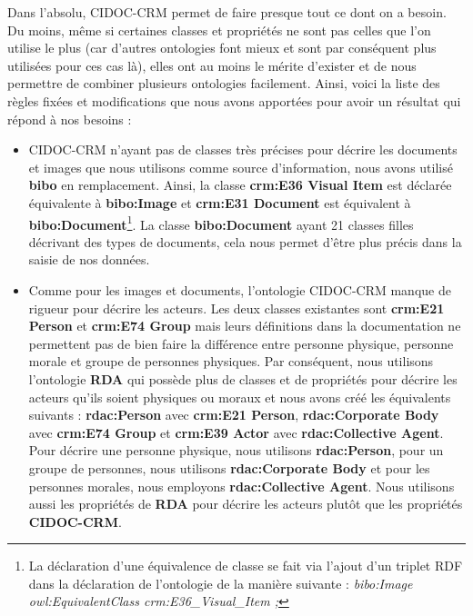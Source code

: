 Dans l'absolu, CIDOC-CRM permet de faire presque tout ce dont on a besoin. Du moins, même si certaines classes et propriétés ne sont pas celles que l'on utilise le plus (car d'autres ontologies font mieux et sont par conséquent plus utilisées pour ces cas là), elles ont au moins le mérite d'exister et de nous permettre de combiner plusieurs ontologies facilement. Ainsi, voici la liste des règles fixées et modifications que nous avons apportées pour avoir un résultat qui répond à nos besoins :
\begin{itemize}
    \item[\ding{103}] CIDOC-CRM n'ayant pas de classes très précises pour décrire les documents et images que nous utilisons comme source d'information, nous avons utilisé \textbf{bibo} en remplacement. Ainsi, la classe \textbf{crm:E36 Visual Item} est déclarée équivalente à \textbf{bibo:Image} et \textbf{crm:E31 Document} est équivalent à \textbf{bibo:Document}\footnote{La déclaration d'une équivalence de classe se fait via l'ajout d'un triplet RDF dans la déclaration de l'ontologie de la manière suivante : \textit{bibo:Image owl:EquivalentClass crm:E36\_Visual\_Item ;}}. La classe \textbf{bibo:Document} ayant 21 classes filles décrivant des types de documents, cela nous permet d'être plus précis dans la saisie de nos données.
    \item[\ding{103}] Comme pour les images et documents, l'ontologie CIDOC-CRM manque de rigueur pour décrire les acteurs. Les deux classes existantes sont \textbf{crm:E21 Person} et \textbf{crm:E74 Group} mais leurs définitions dans la documentation ne permettent pas de bien faire la différence entre personne physique, personne morale et groupe de personnes physiques. Par conséquent, nous utilisons l'ontologie \textbf{RDA} qui possède plus de classes et de propriétés pour décrire les acteurs qu'ils soient physiques ou moraux et nous avons créé les équivalents suivants : \textbf{rdac:Person} avec \textbf{crm:E21 Person}, \textbf{rdac:Corporate Body} avec \textbf{crm:E74 Group} et \textbf{crm:E39 Actor} avec \textbf{rdac:Collective Agent}. Pour décrire une personne physique, nous utilisons \textbf{rdac:Person}, pour un groupe de personnes, nous utilisons \textbf{rdac:Corporate Body} et pour les personnes morales, nous employons \textbf{rdac:Collective Agent}. Nous utilisons aussi les propriétés de \textbf{RDA} pour décrire les acteurs plutôt que les propriétés \textbf{CIDOC-CRM}.

\end{itemize}
